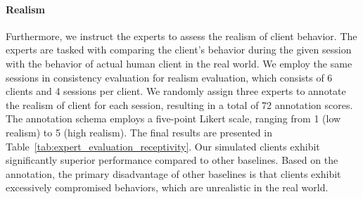 \begin{table}[tb]
\centering
{}
\caption{Expert Evaluation on Profile Consistency and Realism for Client Simulation. Our method demonstrates superior performance compared to the two baselines, with a p-value less than 0.05. Nevertheless, the real client consistently outperforms all simulation methods with a p-value less than 0.01. The overall Kappa score of experts evaluation is 0.61 (p-value $\le 0.05$) indicating moderate agreement.}
\label{tab:expert_evaluation_consistency}
\end{table}

\paragraph{Realism} Furthermore, we instruct the experts to assess the realism of client behavior. The experts are tasked with comparing the client’s behavior during the given session with the behavior of actual human client in the real world. We employ the same sessions in consistency evaluation for realism evaluation, which consists of 6 clients and 4 sessions per client. We randomly assign three experts to annotate the realism of client for each session, resulting in a total of 72 annotation scores. The annotation schema employs a five-point Likert scale, ranging from 1 (low realism) to 5 (high realism). The final results are presented in Table~\ref{tab:expert_evaluation_receptivity}. Our simulated clients exhibit significantly superior performance compared to other baselines. Based on the annotation, the primary disadvantage of other baselines is that clients exhibit excessively compromised behaviors, which are unrealistic in the real world.

